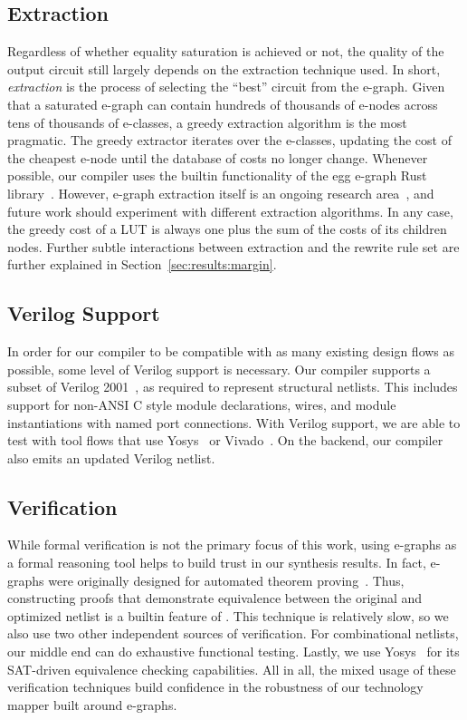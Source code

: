 \subsection{Extraction}\label{sec:flow:extraction}
Regardless of whether equality saturation is achieved or not, the quality of
the output circuit still largely depends on the extraction technique used. In
short, \textit{extraction} is the process of selecting the ``best'' circuit
from the e-graph. Given that a saturated e-graph can contain hundreds of
thousands of e-nodes across tens of thousands of e-classes, a greedy extraction
algorithm is the most pragmatic. The greedy extractor iterates over the
e-classes, updating the cost of the cheapest e-node until the database of costs
no longer change. Whenever possible, our compiler uses the builtin
functionality of the egg e-graph Rust library~\cite{docsEgg}. However, e-graph
extraction itself is an ongoing research area~\cite{smoothe,
    sparsextract,esynth}, and future work should experiment with different
extraction algorithms.  In any case, the greedy cost of a LUT is always one plus the sum
of the costs of its children nodes. Further subtle interactions between
extraction and the rewrite rule set are further explained in
Section~\ref{sec:results:margin}.

\subsection{Verilog Support}\label{sec:flow:verilog}
In order for our compiler to be compatible with as many existing design flows
as possible, some level of Verilog support is necessary. Our compiler supports
a subset of Verilog 2001~\cite{verilog}, as required to represent structural
netlists. This includes support for non-ANSI C style module declarations,
wires, and module instantiations with named port connections. With Verilog
support, we are able to test \shortname{} with tool flows that use
Yosys~\cite{yosys} or Vivado~\cite{vivado}. On the backend, our compiler also
emits an updated Verilog netlist.

\subsection{Verification}\label{sec:flow:verification}
While formal verification is not the primary focus of this work, using e-graphs
as a formal reasoning tool helps to build trust in our synthesis results. In
fact, e-graphs were originally designed for automated theorem
proving~\cite{eggpaper}. Thus, constructing proofs that demonstrate equivalence
between the original and optimized netlist is a builtin feature of
\shortname{}. This technique is relatively slow, so we also use two other
independent sources of verification. For combinational netlists, our middle end
can do exhaustive functional testing. Lastly, we use Yosys~\cite{yosys} for its
SAT-driven equivalence checking capabilities. All in all, the mixed usage of
these verification techniques build confidence in the robustness of our
technology mapper built around e-graphs.